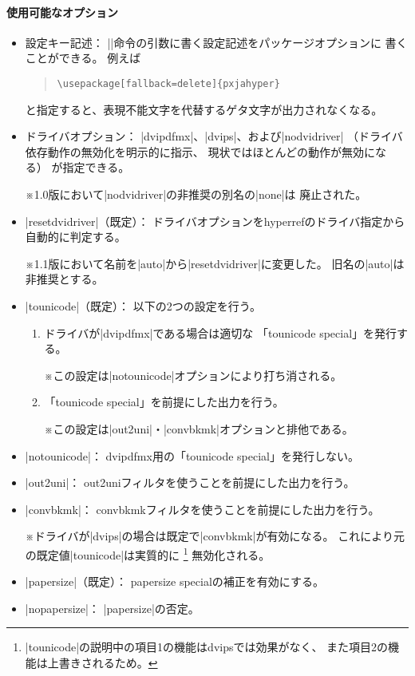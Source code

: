 \documentclass[uplatex,dvipdfmx,a4paper]{jsarticle}
\renewcommand{\headfont}{\gtfamily\romanseries{sbc}\sffamily}
\newcommand{\Pkg}[1]{\textsf{#1}}
\newcommand{\Note}{\par\noindent ※}
\newcommand{\Means}{：\quad}
\providecommand{\Strong}[1]{{\headfont#1}}
\begin{document}
\paragraph{使用可能なオプション}\mbox{}
\begin{itemize}
\item \Strong{設定キー記述}\Means
  |\pxjahypersetup|命令の引数に書く設定記述をパッケージオプションに
  書くことができる。
  例えば
\begin{quote}\small\begin{verbatim}
\usepackage[fallback=delete]{pxjahyper}
\end{verbatim}\end{quote}
  と指定すると、表現不能文字を代替するゲタ文字が出力されなくなる。
\item \Strong{ドライバオプション}\Means
  |dvipdfmx|、|dvips|、および|nodvidriver|%
  （ドライバ依存動作の無効化を明示的に指示、
  現状ではほとんどの動作が無効になる）
  が指定できる。
  \Note 1.0版において|nodvidriver|の非推奨の別名の|none|は
    \Strong{廃止}された。
\item |resetdvidriver|（既定）\Means
  ドライバオプションを\Pkg{hyperref}のドライバ指定から自動的に判定する。
  \Note 1.1版において名前を|auto|から|resetdvidriver|に変更した。
    旧名の|auto|は\Strong{非推奨}とする。
\item |tounicode|（既定）\Means
  以下の2つの設定を行う。
  \begin{enumerate}
  \item ドライバが|dvipdfmx|である場合は適切な
    「tounicode special」を発行する。
    \Note この設定は|notounicode|オプションにより打ち消される。
  \item 「tounicode special」を前提にした出力を行う。
    \Note この設定は|out2uni|・|convbkmk|オプションと排他である。
  \end{enumerate}
\item |notounicode|\Means
  dvipdfmx用の「tounicode special」を発行しない。
\item |out2uni|\Means
  out2uniフィルタを使うことを前提にした出力を行う。
\item |convbkmk|\Means
  convbkmkフィルタを使うことを前提にした出力を行う。
  \Note ドライバが|dvips|の場合は既定で|convbkmk|が有効になる。
  これにより元の既定値|tounicode|は実質的に
  \footnote{|tounicode|の説明中の項目1の機能はdvipsでは効果がなく、
    また項目2の機能は上書きされるため。}%
  無効化される。
\item |papersize|（既定）\Means
  papersize specialの補正を有効にする。
\item |nopapersize|\Means
  |papersize|の否定。
\end{itemize}
\end{document}
